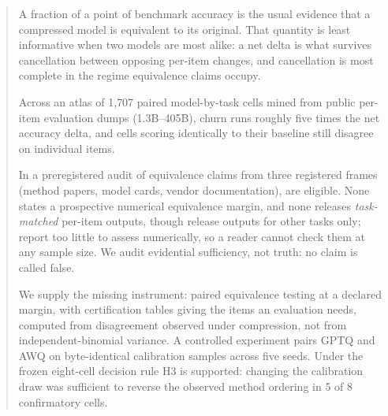 \begin{abstract}
A fraction of a point of benchmark accuracy is the usual evidence that a
compressed model is equivalent to its original. That quantity is least
informative when two models are most alike: a net delta is what survives
cancellation between opposing per-item changes, and cancellation is most
complete in the regime equivalence claims occupy.

Across an atlas of 1{,}707 paired model-by-task cells mined from public
per-item evaluation dumps (1.3B--405B), churn runs roughly five times the net
accuracy delta, and cells scoring identically to their baseline still disagree
on individual items.

In a preregistered audit of \AuditFrozenCandidates{} equivalence claims from
three registered frames (method papers, model cards, vendor documentation),
\AuditEligible{} are eligible. None states a prospective numerical equivalence
margin, and none releases \emph{task-matched} per-item outputs, though
\AuditPerItemOtherTaskOnly{} release outputs for other tasks only;
\AuditNotAssessable{} report too little to assess numerically, so a reader
cannot check them at any sample size. We audit evidential sufficiency, not
truth: no claim is called false.

We supply the missing instrument: paired equivalence testing at a declared
margin, with certification tables giving the items an evaluation needs,
computed from disagreement observed under compression, not from
independent-binomial variance. A controlled experiment pairs GPTQ and AWQ on
byte-identical calibration samples across five seeds. Under the frozen
eight-cell decision rule H3 is supported: changing the calibration draw was
sufficient to reverse the observed method ordering in 5 of 8 confirmatory
cells.


\end{abstract}
